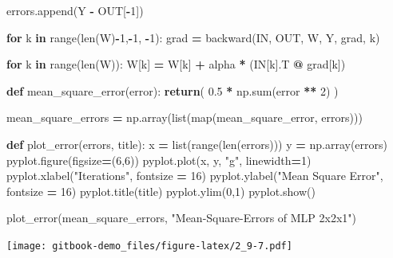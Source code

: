 \documentclass[
]{book}
\newenvironment{Shaded}{\begin{snugshade}}{\end{snugshade}}
\newcommand{\BuiltInTok}[1]{#1}
\newcommand{\ControlFlowTok}[1]{\textcolor[rgb]{0.13,0.29,0.53}{\textbf{#1}}}
\newcommand{\DecValTok}[1]{\textcolor[rgb]{0.00,0.00,0.81}{#1}}
\newcommand{\FloatTok}[1]{\textcolor[rgb]{0.00,0.00,0.81}{#1}}
\newcommand{\KeywordTok}[1]{\textcolor[rgb]{0.13,0.29,0.53}{\textbf{#1}}}
\newcommand{\NormalTok}[1]{#1}
\newcommand{\OperatorTok}[1]{\textcolor[rgb]{0.81,0.36,0.00}{\textbf{#1}}}
\newcommand{\StringTok}[1]{\textcolor[rgb]{0.31,0.60,0.02}{#1}}
\begin{document}
\begin{Shaded}
\begin{Highlighting}[]
\NormalTok{  errors.append(Y }\OperatorTok{{-}}\NormalTok{ OUT[}\OperatorTok{{-}}\DecValTok{1}\NormalTok{])}
    
  \ControlFlowTok{for}\NormalTok{ k }\KeywordTok{in} \BuiltInTok{range}\NormalTok{(}\BuiltInTok{len}\NormalTok{(W)}\OperatorTok{{-}}\DecValTok{1}\NormalTok{,}\OperatorTok{{-}}\DecValTok{1}\NormalTok{, }\OperatorTok{{-}}\DecValTok{1}\NormalTok{):}
\NormalTok{    grad }\OperatorTok{=}\NormalTok{ backward(IN, OUT, W, Y, grad, k) }
    
  \ControlFlowTok{for}\NormalTok{ k }\KeywordTok{in} \BuiltInTok{range}\NormalTok{(}\BuiltInTok{len}\NormalTok{(W)):}
\NormalTok{    W[k] }\OperatorTok{=}\NormalTok{ W[k] }\OperatorTok{+}\NormalTok{ alpha }\OperatorTok{*}\NormalTok{ (IN[k].T }\OperatorTok{@}\NormalTok{ grad[k])}



\KeywordTok{def}\NormalTok{ mean\_square\_error(error):}
  \ControlFlowTok{return}\NormalTok{( }\FloatTok{0.5} \OperatorTok{*}\NormalTok{ np.}\BuiltInTok{sum}\NormalTok{(error }\OperatorTok{**} \DecValTok{2}\NormalTok{) )}

\NormalTok{mean\_square\_errors }\OperatorTok{=}\NormalTok{ np.array(}\BuiltInTok{list}\NormalTok{(}\BuiltInTok{map}\NormalTok{(mean\_square\_error, errors)))}

\KeywordTok{def}\NormalTok{ plot\_error(errors, title):}
\NormalTok{  x }\OperatorTok{=} \BuiltInTok{list}\NormalTok{(}\BuiltInTok{range}\NormalTok{(}\BuiltInTok{len}\NormalTok{(errors)))}
\NormalTok{  y }\OperatorTok{=}\NormalTok{ np.array(errors)}
\NormalTok{  pyplot.figure(figsize}\OperatorTok{=}\NormalTok{(}\DecValTok{6}\NormalTok{,}\DecValTok{6}\NormalTok{))}
\NormalTok{  pyplot.plot(x, y, }\StringTok{"g"}\NormalTok{, linewidth}\OperatorTok{=}\DecValTok{1}\NormalTok{)}
\NormalTok{  pyplot.xlabel(}\StringTok{"Iterations"}\NormalTok{, fontsize }\OperatorTok{=} \DecValTok{16}\NormalTok{)}
\NormalTok{  pyplot.ylabel(}\StringTok{"Mean Square Error"}\NormalTok{, fontsize }\OperatorTok{=} \DecValTok{16}\NormalTok{)}
\NormalTok{  pyplot.title(title)}
\NormalTok{  pyplot.ylim(}\DecValTok{0}\NormalTok{,}\DecValTok{1}\NormalTok{)}
\NormalTok{  pyplot.show()}
  
\NormalTok{plot\_error(mean\_square\_errors, }\StringTok{"Mean{-}Square{-}Errors of MLP 2x2x1"}\NormalTok{)}
\end{Highlighting}
\end{Shaded}

\texttt{[image: gitbook-demo\_files/figure-latex/2\_9-7.pdf]}
\end{document}
